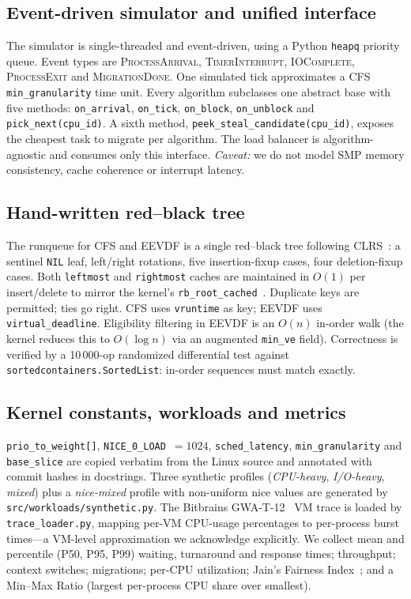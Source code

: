 \documentclass[conference]{IEEEtran}
\begin{document}
\subsection{Event-driven simulator and unified interface}

The simulator is single-threaded and event-driven, using a Python
\texttt{heapq} priority queue. Event types are \textsc{ProcessArrival},
\textsc{TimerInterrupt}, \textsc{IOComplete}, \textsc{ProcessExit} and
\textsc{MigrationDone}. One simulated tick approximates a CFS
\texttt{min\_granularity} time unit. Every algorithm subclasses one
abstract base with five methods: \texttt{on\_arrival},
\texttt{on\_tick}, \texttt{on\_block}, \texttt{on\_unblock} and
\texttt{pick\_next(cpu\_id)}. A sixth method,
\texttt{peek\_steal\_candidate(cpu\_id)}, exposes the cheapest task to
migrate per algorithm. The load balancer is algorithm-agnostic and
consumes only this interface. \emph{Caveat:} we do not model SMP
memory consistency, cache coherence or interrupt latency.

\subsection{Hand-written red--black tree}

The runqueue for CFS and EEVDF is a single red--black tree following
CLRS~\cite{clrs2009}: a sentinel \texttt{NIL} leaf, left/right
rotations, five insertion-fixup cases, four deletion-fixup cases.
Both \texttt{leftmost} and \texttt{rightmost} caches are maintained
in $O(1)$ per insert/delete to mirror the kernel's
\texttt{rb\_root\_cached}~\cite{rb_cached_2017}. Duplicate keys are
permitted; ties go right. CFS uses \texttt{vruntime} as key; EEVDF
uses \texttt{virtual\_deadline}. Eligibility filtering in EEVDF is an
$O(n)$ in-order walk (the kernel reduces this to $O(\log n)$ via an
augmented \texttt{min\_ve} field). Correctness is verified by a
10\,000-op randomized differential test against
\texttt{sortedcontainers.SortedList}: in-order sequences must match
exactly.

\subsection{Kernel constants, workloads and metrics}

\texttt{prio\_to\_weight[]}, \texttt{NICE\_0\_LOAD}~$=1024$,
\texttt{sched\_latency}, \texttt{min\_granularity} and
\texttt{base\_slice} are copied verbatim from the Linux source and
annotated with commit hashes in docstrings. Three synthetic profiles
(\emph{CPU-heavy}, \emph{I/O-heavy}, \emph{mixed}) plus a
\emph{nice-mixed} profile with non-uniform nice values are generated
by \texttt{src/workloads/synthetic.py}. The Bitbrains
GWA-T-12~\cite{shen2015bitbrains} VM trace is loaded by
\texttt{trace\_loader.py}, mapping per-VM CPU-usage percentages to
per-process burst times---a VM-level approximation we acknowledge
explicitly. We collect mean and percentile (P50, P95, P99) waiting,
turnaround and response times; throughput; context switches;
migrations; per-CPU utilization; Jain's Fairness
Index~\cite{jain1984}; and a Min--Max Ratio (largest per-process CPU
share over smallest).
\end{document}
